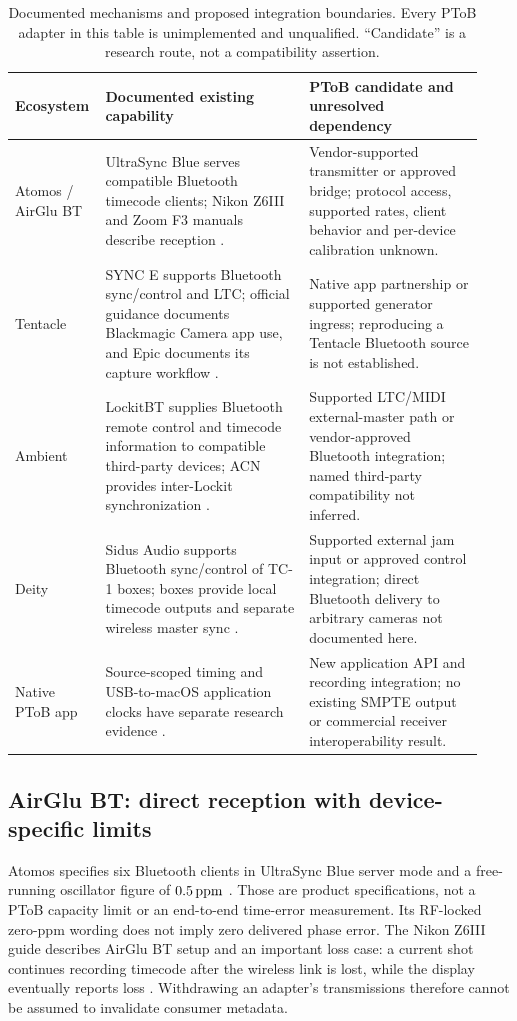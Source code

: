 \documentclass[11pt,letterpaper]{article}
\begin{document}
\begin{table}[htbp]\centering\small
\caption{Documented mechanisms and proposed integration boundaries. Every PToB adapter in this table is unimplemented and unqualified. ``Candidate'' is a research route, not a compatibility assertion.}\label{tab:ecosystems}
\begin{tabular}{@{}L{0.15\linewidth}L{0.42\linewidth}L{0.36\linewidth}@{}}\toprule
Ecosystem & Documented existing capability & PToB candidate and unresolved dependency\\\midrule
Atomos / AirGlu BT & UltraSync Blue serves compatible Bluetooth timecode clients; Nikon Z6III and Zoom F3 manuals describe reception \cite{atomos,nikon,zoom}. & Vendor-supported transmitter or approved bridge; protocol access, supported rates, client behavior and per-device calibration unknown.\\\addlinespace
Tentacle & SYNC E supports Bluetooth sync/control and LTC; official guidance documents Blackmagic Camera app use, and Epic documents its capture workflow \cite{tentacle,blackmagic,epic}. & Native app partnership or supported generator ingress; reproducing a Tentacle Bluetooth source is not established.\\\addlinespace
Ambient & LockitBT supplies Bluetooth remote control and timecode information to compatible third-party devices; ACN provides inter-Lockit synchronization \cite{ambient}. & Supported LTC/MIDI external-master path or vendor-approved Bluetooth integration; named third-party compatibility not inferred.\\\addlinespace
Deity & Sidus Audio supports Bluetooth sync/control of TC-1 boxes; boxes provide local timecode outputs and separate wireless master sync \cite{deityguide}. & Supported external jam input or approved control integration; direct Bluetooth delivery to arbitrary cameras not documented here.\\\addlinespace
Native PToB app & Source-scoped timing and USB-to-macOS application clocks have separate research evidence \cite{viability,usb}. & New application API and recording integration; no existing SMPTE output or commercial receiver interoperability result.\\\bottomrule
\end{tabular}
\end{table}

\subsection{AirGlu BT: direct reception with device-specific limits}
Atomos specifies six Bluetooth clients in UltraSync Blue server mode and a free-running oscillator figure of $0.5\,\mathrm{ppm}$ \cite{atomos}. Those are product specifications, not a PToB capacity limit or an end-to-end time-error measurement. Its RF-locked zero-ppm wording does not imply zero delivered phase error. The Nikon Z6III guide describes AirGlu BT setup and an important loss case: a current shot continues recording timecode after the wireless link is lost, while the display eventually reports loss \cite{nikon}. Withdrawing an adapter's transmissions therefore cannot be assumed to invalidate consumer metadata.
\end{document}
